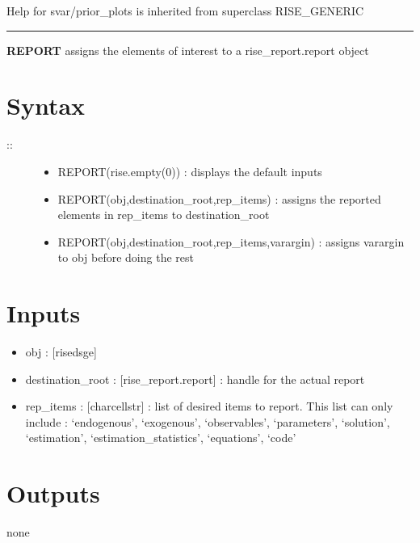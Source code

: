 \documentclass[letterpaper,10pt,english]{sphinxmanual}
\begin{document}
Help for svar/prior\_plots is inherited from superclass RISE\_GENERIC


\bigskip\hrule{}\bigskip

\label{classes/models/@svar/svar:report}
\textbf{REPORT} assigns the elements of interest to a rise\_report.report object


\section{Syntax}
\label{classes/models/@svar/svar:id98}\begin{description}
\item[{::}] \leavevmode\begin{itemize}
\item {} 
REPORT(rise.empty(0)) : displays the default inputs

\item {} 
REPORT(obj,destination\_root,rep\_items) : assigns the reported
elements in rep\_items to destination\_root

\item {} 
REPORT(obj,destination\_root,rep\_items,varargin) : assigns varargin to
obj before doing the rest

\end{itemize}

\end{description}


\section{Inputs}
\label{classes/models/@svar/svar:id99}\begin{itemize}
\item {} 
obj : {[}rise\textbar{}dsge{]}

\item {} 
destination\_root : {[}rise\_report.report{]} : handle for the actual report

\item {} 
rep\_items : {[}char\textbar{}cellstr{]} : list of desired items to report. This list
can only include : `endogenous', `exogenous', `observables',
`parameters', `solution', `estimation', `estimation\_statistics',
`equations', `code'

\end{itemize}


\section{Outputs}
\label{classes/models/@svar/svar:id100}
none
\end{document}
